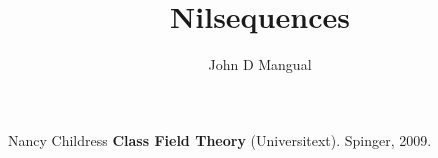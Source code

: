 \documentclass[12pt]{article}
\title{Nilsequences}
\author{John D Mangual}
\date{}
\begin{document}
\selectfont \fontsize{12.5}{15}\selectfont

\maketitle

\noindent 

\vfill

\begin{thebibliography}{}

\item Nancy Childress \textbf{Class Field Theory} (Universitext).  Spinger, 2009.

\end{thebibliography}
\end{document}
